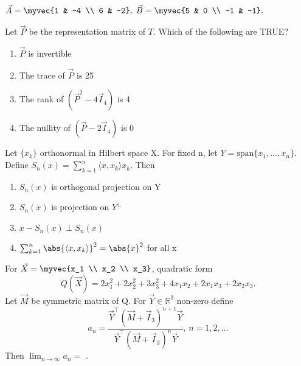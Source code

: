$\vec{A}=\myvec{1 & -4 \\ 6 & -2}, \; \vec{B}=\myvec{5 & 0 \\ -1 & -1}.$  

Let $\vec{P}$ be the representation matrix of $T$. Which of the following are TRUE?  
\hfill{}
\begin{multicols}{2}
\begin{enumerate}
\item $\vec{P}$ is invertible
\item The trace of $\vec{P}$ is 25
\item The rank of $(\vec{P}^2-4\vec{I}_4)$ is 4
\item The nullity of $(\vec{P}-2\vec{I}_4)$ is 0
\end{enumerate}
\end{multicols}
\item Let $\{x_k\}$ orthonormal in Hilbert space X. For fixed n, let $Y=\text{span}\{x_1,\dots,x_n\}$. Define $S_n(x)=\sum_{k=1}^n \langle x,x_k\rangle x_k$. Then
\hfill{}
\begin{enumerate}
\item $S_n(x)$ is orthogonal projection on Y
\item $S_n(x)$ is projection on $Y^\perp$
\item $x-S_n(x)\perp S_n(x)$
\item $\sum_{k=1}^n\abs{\langle x,x_k\rangle}^2=\abs{x}^2$ for all x
\end{enumerate}
\item For $\vec{X}=\myvec{x_1 \\ x_2 \\ x_3}$, quadratic form  
$$
Q(\vec{X})=2x_1^2+2x_2^2+3x_3^2+4x_1x_2+2x_1x_3+2x_2x_3.
$$  
Let $\vec{M}$ be symmetric matrix of Q. For $\vec{Y}\in\mathbb{R}^3$ non-zero define  
$$
a_n=\frac{\vec{Y}^{\top}(\vec{M}+\vec{I}_3)^{n+1}\vec{Y}}{\vec{Y}^{\top}(\vec{M}+\vec{I}_3)^n\vec{Y}}, \, n=1,2,\dots
$$  
Then $\lim_{n\to\infty}a_n=$ \underline{\hspace{2cm}}.  
\hfill{}

